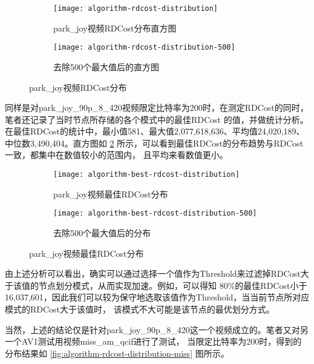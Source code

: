 \begin{figure}[H]
  \centering%
  \begin{subfigure}{0.43\textwidth}
    \centering
    \texttt{[image: algorithm-rdcost-distribution]}
    \caption{park\_joy视频RDCost分布直方图}
  \end{subfigure}%
  \hspace{2em}%
  \begin{subfigure}{0.43\textwidth}
    \centering
    \texttt{[image: algorithm-rdcost-distribution-500]}
    \caption{去除500个最大值后的直方图}
  \end{subfigure}
  \caption{park\_joy视频RDCost分布}
  \label{fig:algorithm-rdcost-distribution}
\end{figure}

同样是对park\_joy\_90p\_8\_420视频限定比特率为200时，在测定RDCost的同时，笔者还记录了当时节点所存储的各个模式中的最佳RDCost
的值，并做统计分析。在最佳RDCost的统计中，最小值581、最大值2,077,618,636、平均值24,020,189、中位数3,490,404。直方图如 
\ref{fig:algorithm-best-rdcost-distribution} 所示，可以看到最佳RDCost的分布趋势与RDCost一致，都集中在数值较小的范围内，
且平均来看数值更小。

\begin{figure}[H]
  \centering%
  \begin{subfigure}{0.43\textwidth}
    \centering
    \texttt{[image: algorithm-best-rdcost-distribution]}
    \caption{park\_joy视频最佳RDCost分布}
  \end{subfigure}%
  \hspace{2em}%
  \begin{subfigure}{0.43\textwidth}
    \centering
    \texttt{[image: algorithm-best-rdcost-distribution-500]}
    \caption{去除500个最大值后的分布}
  \end{subfigure}
  \caption{park\_joy视频最佳RDCost分布}
  \label{fig:algorithm-best-rdcost-distribution}
\end{figure}

由上述分析可以看出，确实可以通过选择一个值作为Threshold来过滤掉RDCost大于该值的节点划分模式，从而实现加速。例如，可以得知
80\%的最佳RDCost小于16,037,601，因此我们可以较为保守地选取该值作为Threshold，当当前节点所对应模式的RDCost大于该值时，
该模式不大可能是该节点的最优划分方式。

当然，上述的结论仅是针对park\_joy\_90p\_8\_420这一个视频成立的。笔者又对另一个AV1测试用视频miss\_am\_qcif进行了测试，
当限定比特率为200时，得到的分布结果如 \ref{fig:algorithm-rdcost-distribution-miss} 图所示。

